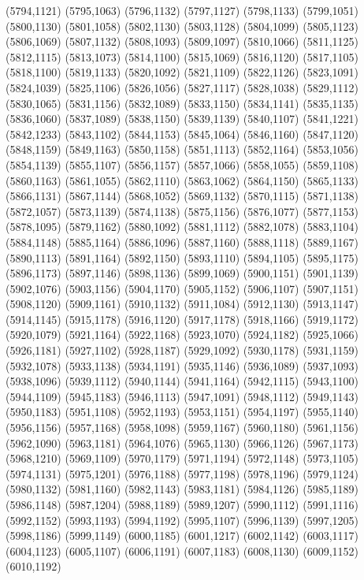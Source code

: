 (5794,1121)
(5795,1063)
(5796,1132)
(5797,1127)
(5798,1133)
(5799,1051)
(5800,1130)
(5801,1058)
(5802,1130)
(5803,1128)
(5804,1099)
(5805,1123)
(5806,1069)
(5807,1132)
(5808,1093)
(5809,1097)
(5810,1066)
(5811,1125)
(5812,1115)
(5813,1073)
(5814,1100)
(5815,1069)
(5816,1120)
(5817,1105)
(5818,1100)
(5819,1133)
(5820,1092)
(5821,1109)
(5822,1126)
(5823,1091)
(5824,1039)
(5825,1106)
(5826,1056)
(5827,1117)
(5828,1038)
(5829,1112)
(5830,1065)
(5831,1156)
(5832,1089)
(5833,1150)
(5834,1141)
(5835,1135)
(5836,1060)
(5837,1089)
(5838,1150)
(5839,1139)
(5840,1107)
(5841,1221)
(5842,1233)
(5843,1102)
(5844,1153)
(5845,1064)
(5846,1160)
(5847,1120)
(5848,1159)
(5849,1163)
(5850,1158)
(5851,1113)
(5852,1164)
(5853,1056)
(5854,1139)
(5855,1107)
(5856,1157)
(5857,1066)
(5858,1055)
(5859,1108)
(5860,1163)
(5861,1055)
(5862,1110)
(5863,1062)
(5864,1150)
(5865,1133)
(5866,1131)
(5867,1144)
(5868,1052)
(5869,1132)
(5870,1115)
(5871,1138)
(5872,1057)
(5873,1139)
(5874,1138)
(5875,1156)
(5876,1077)
(5877,1153)
(5878,1095)
(5879,1162)
(5880,1092)
(5881,1112)
(5882,1078)
(5883,1104)
(5884,1148)
(5885,1164)
(5886,1096)
(5887,1160)
(5888,1118)
(5889,1167)
(5890,1113)
(5891,1164)
(5892,1150)
(5893,1110)
(5894,1105)
(5895,1175)
(5896,1173)
(5897,1146)
(5898,1136)
(5899,1069)
(5900,1151)
(5901,1139)
(5902,1076)
(5903,1156)
(5904,1170)
(5905,1152)
(5906,1107)
(5907,1151)
(5908,1120)
(5909,1161)
(5910,1132)
(5911,1084)
(5912,1130)
(5913,1147)
(5914,1145)
(5915,1178)
(5916,1120)
(5917,1178)
(5918,1166)
(5919,1172)
(5920,1079)
(5921,1164)
(5922,1168)
(5923,1070)
(5924,1182)
(5925,1066)
(5926,1181)
(5927,1102)
(5928,1187)
(5929,1092)
(5930,1178)
(5931,1159)
(5932,1078)
(5933,1138)
(5934,1191)
(5935,1146)
(5936,1089)
(5937,1093)
(5938,1096)
(5939,1112)
(5940,1144)
(5941,1164)
(5942,1115)
(5943,1100)
(5944,1109)
(5945,1183)
(5946,1113)
(5947,1091)
(5948,1112)
(5949,1143)
(5950,1183)
(5951,1108)
(5952,1193)
(5953,1151)
(5954,1197)
(5955,1140)
(5956,1156)
(5957,1168)
(5958,1098)
(5959,1167)
(5960,1180)
(5961,1156)
(5962,1090)
(5963,1181)
(5964,1076)
(5965,1130)
(5966,1126)
(5967,1173)
(5968,1210)
(5969,1109)
(5970,1179)
(5971,1194)
(5972,1148)
(5973,1105)
(5974,1131)
(5975,1201)
(5976,1188)
(5977,1198)
(5978,1196)
(5979,1124)
(5980,1132)
(5981,1160)
(5982,1143)
(5983,1181)
(5984,1126)
(5985,1189)
(5986,1148)
(5987,1204)
(5988,1189)
(5989,1207)
(5990,1112)
(5991,1116)
(5992,1152)
(5993,1193)
(5994,1192)
(5995,1107)
(5996,1139)
(5997,1205)
(5998,1186)
(5999,1149)
(6000,1185)
(6001,1217)
(6002,1142)
(6003,1117)
(6004,1123)
(6005,1107)
(6006,1191)
(6007,1183)
(6008,1130)
(6009,1152)
(6010,1192)
